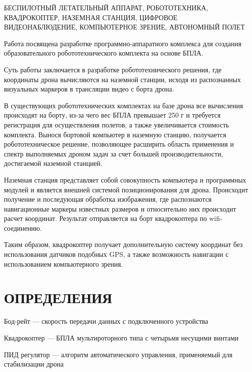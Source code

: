 \documentclass[a4paper,12pt]{article}
\begin{document}
БЕСПИЛОТНЫЙ ЛЕТАТЕЛЬНЫЙ АППАРАТ, РОБОТОТЕХНИКА, КВАДРОКОПТЕР, НАЗЕМНАЯ СТАНЦИЯ, ЦИФРОВОЕ ВИДЕОНАБЛЮДЕНИЕ, КОМПЬЮТЕРНОЕ ЗРЕНИЕ, АВТОНОМНЫЙ ПОЛЕТ

Работа посвящена разработке программно-аппаратного комплекса для создания образовательного робототехнического комплекта на основе БПЛА.

Суть работы заключается в разработке робототехнического решения, где координаты дрона вычисляются на наземной станции, исходя из распознанных визуальных маркеров в трансляции видео с борта дрона.

В существующих робототехнических комплектах на базе дрона все вычисления происходят на борту, из-за чего вес БПЛА превышает 250 г и требуется регистрация для осуществления полетов, а также увеличивается стоимость комплекта. Вынося бортовой компьютер в наземную станцию, получается робототехническое решение, позволяющее расширить область применения и спектр выполняемых дроном задач за счет большей производительности, достигаемой наземной станцией. 

Наземная станция представляет собой совокупность компьютера и программных модулей и является внешней системой позиционирования для дрона. Происходит получение и последующая обработка изображения, где распознаются навигационные маркеры известных размеров и относительно них происходит расчет координат. Результат отправляется на борт квадрокоптера по wifi-соединению.
 
Таким образом, квадрокоптер получает дополнительную систему координат без использования датчиков подобных GPS, а также возможность навигации с использованием компьютерного зрения.

\pagebreak
\thispagestyle{empty}

\section*{\centering ОПРЕДЕЛЕНИЯ}

\thispagestyle{empty} %

Бод-рейт --- скорость передачи данных с подключенного устройства

Квадрокоптер --- БПЛА мультироторного типа с четырьмя несущими винтами

ПИД регулятор --- алгоритм автоматического управления, применяемый для стабилизации дрона
\end{document}
